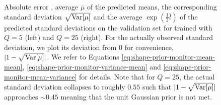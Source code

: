 \begin{figure}
\begin{subfigure}[t]{0.48\textwidth}
  \end{subfigure}
  \caption{Absolute error \Abs, average $\overline{\mu}$ of the predicted means,
  the corresponding standard deviation $\sqrt{\mathrm{Var}[\mu]}$ and the average
  $\exp(\frac{1}{2}\overline{l})$ of the predicted standard deviations 
  on the validation set for
  \VAEs trained with $Q = 5$ (left) and $Q = 25$ (right). For the actually
  observed standard deviation, we plot its deviation from $0$ for convenience,
  \ie $|1 - \sqrt{\mathrm{Var}[\mu]}|$. We refer to
  Equations \eqref{eq:shape-prior-monitor-mean-mean},
  \eqref{eq:shape-prior-monitor-variance-mean} and \eqref{eq:shape-prior-monitor-mean-variance}
  for details. Note that for $Q = 25$, the actual standard deviation
  collapses to roughly $0.55$ such that $|1 - \sqrt{\mathrm{Var}[\mu]}|$ approaches
  $\sim 0.45$ meaning that the unit Gaussian prior is not met.}
  \label{fig:experiments-2d-vae-occ-5}
\end{figure}
